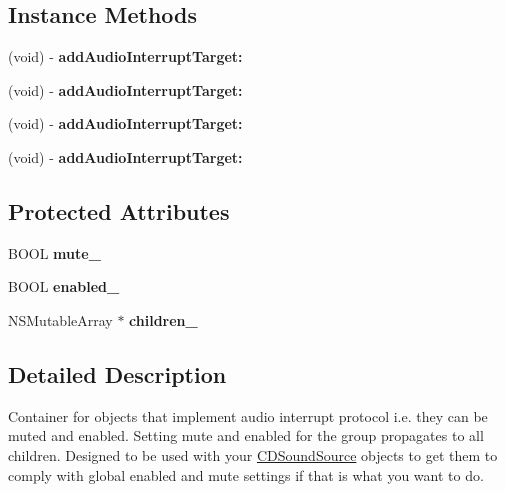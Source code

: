 \subsection*{Instance Methods}
\begin{DoxyCompactItemize}
\item 
\mbox{\label{interfaceCDAudioInterruptTargetGroup_adaea03ff50fe3ae6338967665161b4e3}} 
(void) -\/ {\bfseries add\+Audio\+Interrupt\+Target\+:}
\item 
\mbox{\label{interfaceCDAudioInterruptTargetGroup_adaea03ff50fe3ae6338967665161b4e3}} 
(void) -\/ {\bfseries add\+Audio\+Interrupt\+Target\+:}
\item 
\mbox{\label{interfaceCDAudioInterruptTargetGroup_adaea03ff50fe3ae6338967665161b4e3}} 
(void) -\/ {\bfseries add\+Audio\+Interrupt\+Target\+:}
\item 
\mbox{\label{interfaceCDAudioInterruptTargetGroup_adaea03ff50fe3ae6338967665161b4e3}} 
(void) -\/ {\bfseries add\+Audio\+Interrupt\+Target\+:}
\end{DoxyCompactItemize}
\subsection*{Protected Attributes}
\begin{DoxyCompactItemize}
\item 
\mbox{\label{interfaceCDAudioInterruptTargetGroup_a0c21f03d4f292be83b2bc6367f0cb455}} 
B\+O\+OL {\bfseries mute\+\_\+}
\item 
\mbox{\label{interfaceCDAudioInterruptTargetGroup_ad4f3381e0b8ab006350a78d11fa60f35}} 
B\+O\+OL {\bfseries enabled\+\_\+}
\item 
\mbox{\label{interfaceCDAudioInterruptTargetGroup_a23330000b17d428c2103a08d9f21e1cf}} 
N\+S\+Mutable\+Array $\ast$ {\bfseries children\+\_\+}
\end{DoxyCompactItemize}


\subsection{Detailed Description}
Container for objects that implement audio interrupt protocol i.\+e. they can be muted and enabled. Setting mute and enabled for the group propagates to all children. Designed to be used with your \hyperlink{interfaceCDSoundSource}{C\+D\+Sound\+Source} objects to get them to comply with global enabled and mute settings if that is what you want to do. 


